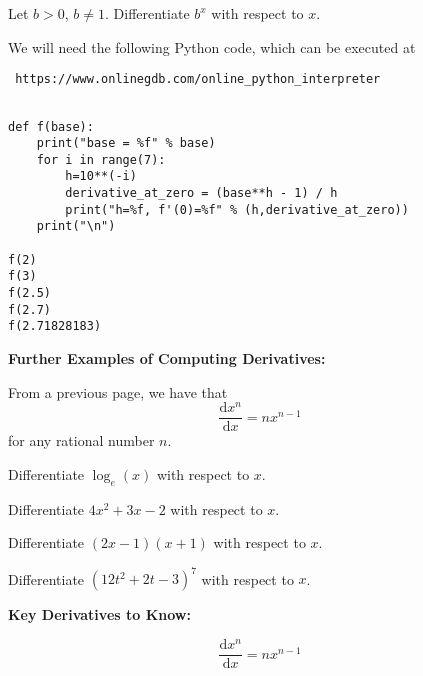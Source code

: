 \documentclass{article}
\newcommand{\deriv}[2]{\frac{\mathrm{d}#1}{\mathrm{d}#2}}
\begin{document}
\vfill


Let $b>0$, $b\neq 1$. Differentiate $b^x$ with respect to $x$.

\vfill

We will need the following Python code, which can be executed at \begin{verbatim} https://www.onlinegdb.com/online_python_interpreter \end{verbatim}

\begin{verbatim}

def f(base):
    print("base = %f" % base)
    for i in range(7):
        h=10**(-i)
        derivative_at_zero = (base**h - 1) / h
        print("h=%f, f'(0)=%f" % (h,derivative_at_zero))
    print("\n")
        
f(2)
f(3)
f(2.5)
f(2.7)
f(2.71828183)

\end{verbatim}



\clearpage









\textbf{Further Examples of Computing Derivatives:}

\vspace{5mm}


From a previous page, we have that
\[\deriv{x^n}{x}=nx^{n-1}\]
for any rational number $n$.

\bigskip

Differentiate $\log_e(x)$ with respect to $x$.

\vfill


Differentiate $4x^2+3x-2$ with respect to $x$.

\vfill

Differentiate $(2x-1)(x+1)$ with respect to $x$.

\vfill


Differentiate $(12t^2+2t-3)^7$ with respect to $x$.

\vfill




\clearpage









\textbf{Key Derivatives to Know:}

\bigskip

\[\deriv{x^n}{x}=nx^{n-1}\]
\end{document}
